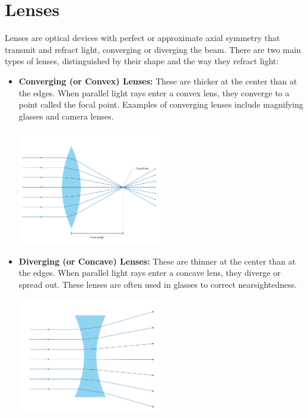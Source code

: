 \chapter{Lenses}

Lenses are optical devices with perfect or approximate axial symmetry
that transmit and refract light, converging or diverging the
beam. There are two main types of lenses, distinguished by their shape
and the way they refract light:

\begin{itemize}
    \item \textbf{Converging (or Convex) Lenses:} These are thicker at
      the center than at the edges. When parallel light rays enter a
      convex lens, they converge to a point called the focal
      point. Examples of converging lenses include magnifying glasses
      and camera lenses.

      \includegraphics[width=0.5\textwidth]{convex.png}

    \item \textbf{Diverging (or Concave) Lenses:} These are thinner at
      the center than at the edges. When parallel light rays enter a
      concave lens, they diverge or spread out. These lenses are often
      used in glasses to correct nearsightedness.
      
      \includegraphics[width=0.5\textwidth]{concave.png}

\end{itemize}

